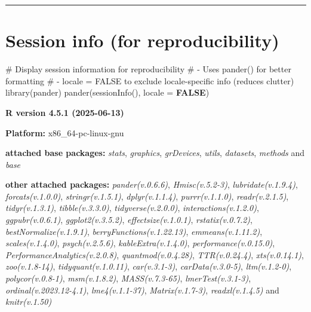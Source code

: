 \documentclass[
  bookmarksnumbered]{article}
\newenvironment{Shaded}{\begin{snugshade}}{\end{snugshade}}
\newcommand{\AttributeTok}[1]{\textcolor[rgb]{0.80,0.80,0.80}{#1}}
\newcommand{\CommentTok}[1]{\textcolor[rgb]{0.50,0.62,0.50}{#1}}
\newcommand{\ConstantTok}[1]{\textcolor[rgb]{0.86,0.64,0.64}{\textbf{#1}}}
\newcommand{\FunctionTok}[1]{\textcolor[rgb]{0.94,0.94,0.56}{#1}}
\newcommand{\NormalTok}[1]{\textcolor[rgb]{0.80,0.80,0.80}{#1}}
\begin{document}
\begin{center}\rule{0.5\linewidth}{0.5pt}\end{center}

\section{Session info (for reproducibility)}\label{session}

\begin{Shaded}
\begin{Highlighting}[]
\CommentTok{\# Display session information for reproducibility}
\CommentTok{\# {-} Uses \textasciigrave{}pander()\textasciigrave{} for better formatting}
\CommentTok{\# {-} \textasciigrave{}locale = FALSE\textasciigrave{} to exclude locale{-}specific info (reduces clutter)}
\FunctionTok{library}\NormalTok{(pander)}
\FunctionTok{pander}\NormalTok{(}\FunctionTok{sessionInfo}\NormalTok{(), }\AttributeTok{locale =} \ConstantTok{FALSE}\NormalTok{)}
\end{Highlighting}
\end{Shaded}

\textbf{R version 4.5.1 (2025-06-13)}

\textbf{Platform:} x86\_64-pc-linux-gnu

\textbf{attached base packages:}
\emph{stats}, \emph{graphics}, \emph{grDevices}, \emph{utils}, \emph{datasets}, \emph{methods} and \emph{base}

\textbf{other attached packages:}
\emph{pander(v.0.6.6)}, \emph{Hmisc(v.5.2-3)}, \emph{lubridate(v.1.9.4)}, \emph{forcats(v.1.0.0)}, \emph{stringr(v.1.5.1)}, \emph{dplyr(v.1.1.4)}, \emph{purrr(v.1.1.0)}, \emph{readr(v.2.1.5)}, \emph{tidyr(v.1.3.1)}, \emph{tibble(v.3.3.0)}, \emph{tidyverse(v.2.0.0)}, \emph{interactions(v.1.2.0)}, \emph{ggpubr(v.0.6.1)}, \emph{ggplot2(v.3.5.2)}, \emph{effectsize(v.1.0.1)}, \emph{rstatix(v.0.7.2)}, \emph{bestNormalize(v.1.9.1)}, \emph{berryFunctions(v.1.22.13)}, \emph{emmeans(v.1.11.2)}, \emph{scales(v.1.4.0)}, \emph{psych(v.2.5.6)}, \emph{kableExtra(v.1.4.0)}, \emph{performance(v.0.15.0)}, \emph{PerformanceAnalytics(v.2.0.8)}, \emph{quantmod(v.0.4.28)}, \emph{TTR(v.0.24.4)}, \emph{xts(v.0.14.1)}, \emph{zoo(v.1.8-14)}, \emph{tidyquant(v.1.0.11)}, \emph{car(v.3.1-3)}, \emph{carData(v.3.0-5)}, \emph{ltm(v.1.2-0)}, \emph{polycor(v.0.8-1)}, \emph{msm(v.1.8.2)}, \emph{MASS(v.7.3-65)}, \emph{lmerTest(v.3.1-3)}, \emph{ordinal(v.2023.12-4.1)}, \emph{lme4(v.1.1-37)}, \emph{Matrix(v.1.7-3)}, \emph{readxl(v.1.4.5)} and \emph{knitr(v.1.50)}
\end{document}
